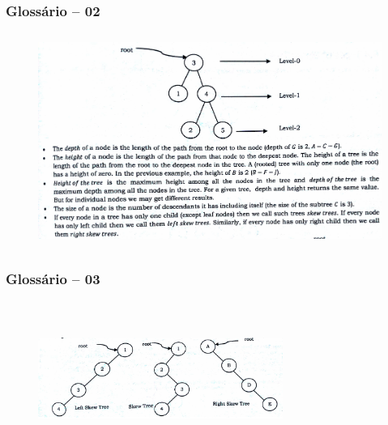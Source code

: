 \begin{frame}

    \frametitle{Glossário -- 02}
    
     \begin{figure}[!ht]
     \centering
    \includegraphics[width=12cm, height=7cm]{figs/fig_arvores/glossario_arv_02.png}
    \end{figure}

\end{frame}
\begin{frame}

    \frametitle{Glossário -- 03}
    
     \begin{figure}[!ht]
     \centering
    \includegraphics[width=8cm, height=5cm]{figs/fig_arvores/glossario_arv_03.png}
    \end{figure}

\end{frame}

